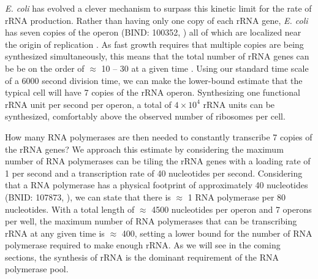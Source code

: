 \textit{E. coli} has evolved a clever mechanism to surpass this kinetic limit
for the rate of rRNA production. Rather than having only one copy of each
rRNA gene, \textit{E. coli} has seven copies of the operon (BIND: 100352,
\cite{milo2010}) all of which are localized near the origin of replication
\citep{birnbaum1971}. As fast growth requires that multiple copies are being
synthesized simultaneously, this means that the total number of rRNA genes
can be be on the order of $\approx$ 10 -- 30 at a given time
\citep{stevenson2004}. Using our standard time scale of a 6000 second
division time, we can make the lower-bound estimate that the typical cell
will have 7 copies of the rRNA operon. Synthesizing one functional rRNA unit
per second per operon, a total of $4 \times 10^4$ rRNA units can be
synthesized, comfortably above the observed number of ribosomes per cell.

How many RNA polymerases are then needed to constantly transcribe 7 copies of
the rRNA genes? We approach this estimate by considering the maximum number
of RNA polymerases can be tiling the rRNA genes with a loading rate of 1 per
second and a transcription rate of 40 nucleotides per second. Considering
that a RNA polymerase has a physical footprint of approximately 40
nucleotides (BNID: 107873, \cite{milo2010}), we can state that there is
$\approx$ 1 RNA polymerase per 80 nucleotides. With a total length of
$\approx$ 4500 nucleotides per operon and 7 operons per well, the maximum
number of RNA polymerases that can be transcribing rRNA at any given time is
$\approx$ 400, setting a lower bound for the number of RNA polymerase
required to make enough rRNA. As we will see in the coming sections, the
synthesis of rRNA is the dominant requirement of the RNA polymerase pool.

